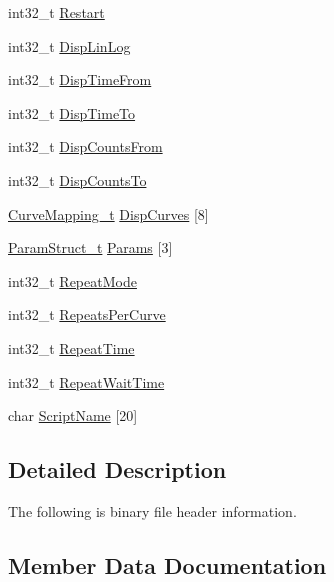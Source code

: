 \begin{DoxyCompactItemize}
\item 
int32\+\_\+t \hyperlink{structpq__ht3___bin_hdr__t_ab461fe05ea59b3672c7edaedd9de9d21}{Restart}
\item 
int32\+\_\+t \hyperlink{structpq__ht3___bin_hdr__t_ae9be6f2a5c0e5f079996beaeb3dfa050}{Disp\+Lin\+Log}
\item 
int32\+\_\+t \hyperlink{structpq__ht3___bin_hdr__t_ae4f31f93a1628328a351332716151c25}{Disp\+Time\+From}
\item 
int32\+\_\+t \hyperlink{structpq__ht3___bin_hdr__t_ad65e4294928135e0be5e45ceb7446e36}{Disp\+Time\+To}
\item 
int32\+\_\+t \hyperlink{structpq__ht3___bin_hdr__t_a4d6ff7a3c613ce69d6344c1d46c2db60}{Disp\+Counts\+From}
\item 
int32\+\_\+t \hyperlink{structpq__ht3___bin_hdr__t_af8ac9f39b4029a1479156f4e751fcbc9}{Disp\+Counts\+To}
\item 
\hyperlink{struct_curve_mapping__t}{Curve\+Mapping\+\_\+t} \hyperlink{structpq__ht3___bin_hdr__t_ad9ca4207f0eca3dc4c2ff840876f5ece}{Disp\+Curves} \mbox{[}8\mbox{]}
\item 
\hyperlink{struct_param_struct__t}{Param\+Struct\+\_\+t} \hyperlink{structpq__ht3___bin_hdr__t_a2bb190c9b0dc2161810c3d944ef812d2}{Params} \mbox{[}3\mbox{]}
\item 
int32\+\_\+t \hyperlink{structpq__ht3___bin_hdr__t_ab7c8e67da509f1f5f4e424d2d602f5a9}{Repeat\+Mode}
\item 
int32\+\_\+t \hyperlink{structpq__ht3___bin_hdr__t_ae25496c5174f8a629c63775d4c96f441}{Repeats\+Per\+Curve}
\item 
int32\+\_\+t \hyperlink{structpq__ht3___bin_hdr__t_a449f11cb1d8c97109f7f039e2dbbaae0}{Repeat\+Time}
\item 
int32\+\_\+t \hyperlink{structpq__ht3___bin_hdr__t_a9f5da511bf47a5303accec1e60481ec8}{Repeat\+Wait\+Time}
\item 
char \hyperlink{structpq__ht3___bin_hdr__t_a3fcdb1ac93307646b85f645e4f305024}{Script\+Name} \mbox{[}20\mbox{]}
\end{DoxyCompactItemize}


\subsection{Detailed Description}
The following is binary file header information. 

\subsection{Member Data Documentation}
\mbox{\label{structpq__ht3___bin_hdr__t_ab9c5f8bc82e787769d011055d370f20e}} 
